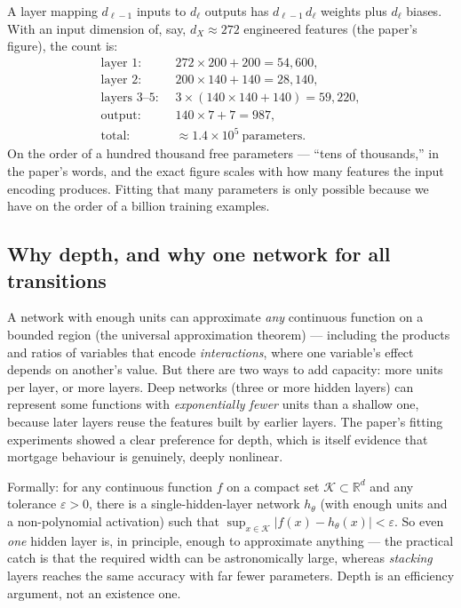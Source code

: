 \documentclass[11pt]{article}
\newcommand{\R}{\mathbb{R}}
\begin{document}
\begin{derivation}
A layer mapping $d_{\ell-1}$ inputs to $d_\ell$ outputs has $d_{\ell-1}\,d_\ell$ weights
plus $d_\ell$ biases. With an input dimension of, say, $d_X \approx 272$ engineered
features (the paper's figure), the count is:
\[
\begin{aligned}
  \text{layer 1:} &\;\; 272\times 200 + 200 = 54{,}600,\\
  \text{layer 2:} &\;\; 200\times 140 + 140 = 28{,}140,\\
  \text{layers 3--5:} &\;\; 3\times(140\times 140 + 140) = 59{,}220,\\
  \text{output:} &\;\; 140\times 7 + 7 = 987,\\[2pt]
  \text{total:} &\;\; \approx 1.4\times 10^{5}\ \text{parameters.}
\end{aligned}
\]
On the order of a hundred thousand free parameters --- ``tens of thousands,'' in the
paper's words, and the exact figure scales with how many features the input encoding
produces. Fitting that many parameters is only possible because we have on the order of a
billion training examples.
\end{derivation}

\subsection{Why depth, and why one network for all transitions}

\begin{intuition}
A network with enough units can approximate \emph{any} continuous function on a bounded
region (the universal approximation theorem) --- including the products and ratios of
variables that encode \emph{interactions}, where one variable's effect depends on another's
value. But there are two ways to add capacity: more units per layer, or more layers. Deep
networks (three or more hidden layers) can represent some functions with
\emph{exponentially fewer} units than a shallow one, because later layers reuse the
features built by earlier layers. The paper's fitting experiments showed a clear preference
for depth, which is itself evidence that mortgage behaviour is genuinely, deeply nonlinear.
\end{intuition}

\begin{derivation}
Formally: for any continuous function $f$ on a compact set $\mathcal{K}\subset\R^{d}$ and any
tolerance $\varepsilon>0$, there is a single-hidden-layer network $h_\theta$ (with enough
units and a non-polynomial activation) such that
$\sup_{x\in\mathcal{K}}\lvert f(x)-h_\theta(x)\rvert<\varepsilon$. So even \emph{one} hidden
layer is, in principle, enough to approximate anything --- the practical catch is that the
required width can be astronomically large, whereas \emph{stacking} layers reaches the same
accuracy with far fewer parameters. Depth is an efficiency argument, not an existence one.
\end{derivation}
\end{document}

